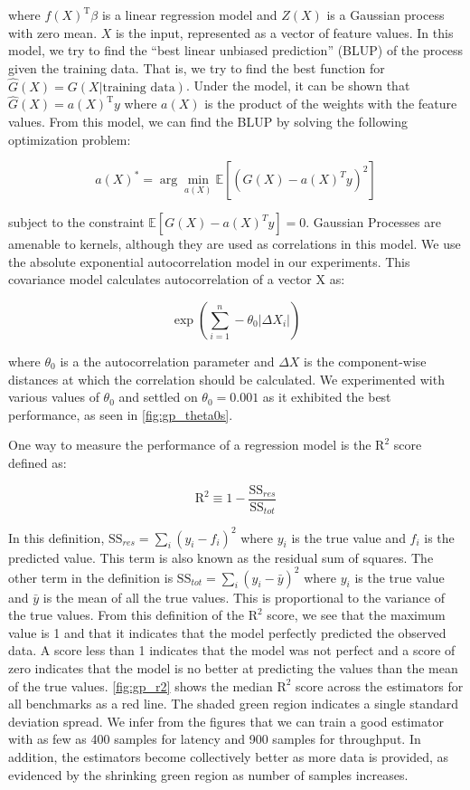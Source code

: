 where $f(X)^{\textrm{T}}\beta$ is a linear regression model and $Z(X)$
is a Gaussian process with zero mean. $X$ is the input, represented as
a vector of feature values.  In this model, we try to find the ``best
linear unbiased prediction'' (BLUP) of the process given the training
data. That is, we try to find the best function for
$\hat{G}(X) = G(X|\textrm{training data})$. Under the model, it can be
shown that $\hat{G}(X) = a(X)^{\textrm{T}}y$ where $a(X)$ is the
product of the weights with the feature values. From this model, we
can find the BLUP by solving the following optimization problem:

\begin{equation*}
a(X)^* = \arg \min\limits_{a(X)} \mathbb{E}[(G(X) - a(X)^T y)^2]
\end{equation*}

subject to the constraint $\mathbb{E}[G(X) - a(X)^T y] = 0$. Gaussian
Processes are amenable to kernels, although they are used as
correlations in this model. We use the absolute exponential
autocorrelation model in our experiments. This covariance model
calculates autocorrelation of a vector X as:

\begin{equation*}
  \exp\left( \sum_{i = 1}^n -\theta_0 |\Delta X_i| \right)
\end{equation*}

where $\theta_0$ is a the autocorrelation parameter and $\Delta X$ is
the component-wise distances at which the correlation should be
calculated. We experimented with various values of $\theta_0$ and
settled on $\theta_0 = 0.001$ as it exhibited the best performance, as
seen in \cref{fig:gp_theta0s}.

One way to measure the performance of a regression model is the
$\textrm{R}^2$ score defined as:

\begin{equation*}
  \textrm{R}^2 \equiv 1 - \frac{\textrm{SS}_{res}}{\textrm{SS}_{tot}}
\end{equation*}

In this definition, $\textrm{SS}_{res} = \sum_i (y_i - f_i)^2$ where
$y_i$ is the true value and $f_i$ is the predicted value. This term is
also known as the residual sum of squares. The other term in the
definition is $\textrm{SS}_{tot} = \sum_i (y_i - \bar{y})^2$ where
$y_i$ is the true value and $\bar{y}$ is the mean of all the true
values. This is proportional to the variance of the true values. From
this definition of the $\textrm{R}^2$ score, we see that the maximum
value is 1 and that it indicates that the model perfectly predicted
the observed data. A score less than 1 indicates that the model was
not perfect and a score of zero indicates that the model is no better
at predicting the values than the mean of the true
values. \cref{fig:gp_r2} shows
the median $\textrm{R}^2$ score across the estimators for all
benchmarks as a red line. The shaded green region indicates a single
standard deviation spread. We infer from the figures that we can
train a good estimator with as few as 400 samples for latency and 900
samples for throughput. In
addition, the estimators become collectively better as more data is
provided, as evidenced by the shrinking green region as number of
samples increases.

